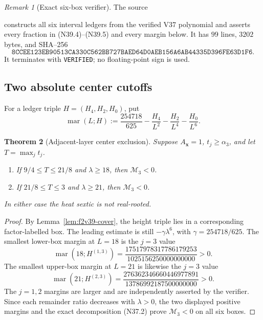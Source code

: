 \documentclass[11pt]{article}
\newtheorem{theorem}{Theorem}[section]
\theoremstyle{definition}
\theoremstyle{remark}
\newtheorem{remark}[theorem]{Remark}
\begin{document}
\begin{remark}[Exact six-box verifier]
\label{rem:f2v39-verifier}
The source
\begin{center}
\end{center}
constructs all six interval ledgers from the verified V37 polynomial and
asserts every fraction in \textup{(N39.4)}--\textup{(N39.5)} and every
margin below.  It has \(99\) lines, \(3202\) bytes, and SHA--256
\[
\texttt{8CCEE123EB90513CA330C562BB727BAED64D0AEB156A6AB44335D396FE63D1F6}.
\tag{N39.6}
\]
It terminates with \texttt{VERIFIED}; no floating-point sign is used.
\end{remark}

\subsection{Two absolute center cutoffs}

For a ledger triple \(H=(H_4,H_2,H_0)\), put
\[
 \operatorname{mar}(L;H):=
 \frac{254718}{625}-\frac{H_4}{L^2}
 -\frac{H_2}{L^4}-\frac{H_0}{L^6}.
\tag{N39.7}
\]

\begin{theorem}[Adjacent-layer center exclusion]
\label{thm:f2v39-center-cutoff}
Suppose \(A_{\bm x}=1\), \(t_j\geq\alpha_3\), and let
\(T=\max_jt_j\).

\begin{enumerate}[label=\textup{(\roman*)}]
\item If \(9/4\leq T\leq21/8\) and \(\lambda\geq18\), then
\(\mathcal M_3<0\).
\item If \(21/8\leq T\leq3\) and \(\lambda\geq21\), then
\(\mathcal M_3<0\).
\end{enumerate}
In either case the heat sextic is not real-rooted.
\end{theorem}

\begin{proof}
By Lemma~\ref{lem:f2v39-cover}, the height triple lies in a corresponding
factor-labelled box.  The leading estimate is still
\(-\gamma\lambda^6\), with \(\gamma=254718/625\).  The smallest lower-box
margin at \(L=18\) is the \(j=3\) value
\[
 \operatorname{mar}(18;H^{(1,3)})
 =\frac{17517978317786179253}{1025156250000000000}>0.
\tag{N39.8}
\]
The smallest upper-box margin at \(L=21\) is likewise the \(j=3\) value
\[
 \operatorname{mar}(21;H^{(2,3)})
 =\frac{276362346660446977891}{13786992187500000000}>0.
\tag{N39.9}
\]
The \(j=1,2\) margins are larger and are independently asserted by the
verifier.  Since each remainder ratio decreases with \(\lambda>0\), the
two displayed positive margins and the exact decomposition
\textup{(N37.2)} prove \(\mathcal M_3<0\) on all six boxes.
\end{proof}
\end{document}
